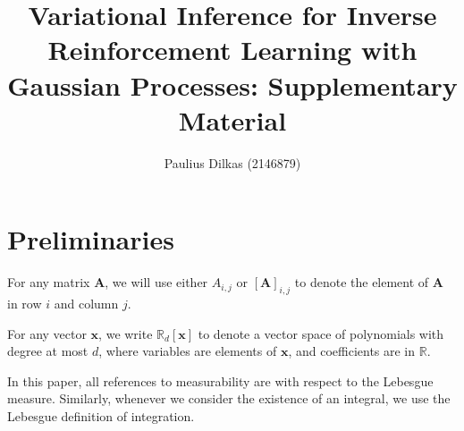 \documentclass{article}
\title{Variational Inference for Inverse Reinforcement Learning with Gaussian
  Processes: Supplementary Material}
\author{Paulius Dilkas (2146879)}
\theoremstyle{definition}
\theoremstyle{remark}
\begin{document}
\maketitle

\section{Preliminaries}

For any matrix $\mathbf{A}$, we will use either $A_{i,j}$ or
$[\mathbf{A}]_{i,j}$ to denote the element of $\mathbf{A}$ in row $i$ and column
$j$.

For any vector $\mathbf{x}$, we write $\mathbb{R}_d[\mathbf{x}]$ to denote a
vector space of polynomials with degree at most $d$, where variables are
elements of $\mathbf{x}$, and coefficients are in $\mathbb{R}$.

In this paper, all references to measurability are with respect to the Lebesgue
measure. Similarly, whenever we consider the existence of an integral, we use
the Lebesgue definition of integration.
\end{document}
